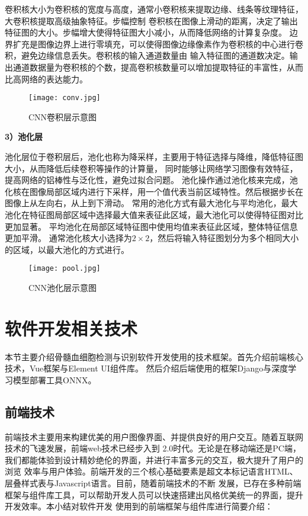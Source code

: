 卷积核大小为卷积核的宽度与高度，通常小卷积核来提取边缘、线条等纹理特征，大卷积核提取高级抽象特征。步幅控制
卷积核在图像上滑动的距离，决定了输出特征图的大小。步幅增大使得特征图大小减小，从而降低网络的计算复杂度。
边界扩充是图像边界上进行零填充，可以使得图像边缘像素作为卷积核的中心进行卷积，避免边缘信息丢失。卷积核的输入通道数量由
输入特征图的通道数决定。输出通道数据量为卷积核的个数，提高卷积核数量可以增加提取特征的丰富性，从而比高网络的表达能力。

\begin{figure}
  \centering
  \texttt{[image: conv.jpg]}
  \caption{CNN卷积层示意图}
  \label{fig:conv}
\end{figure}

\textbf{3）池化层}

池化层位于卷积层后，池化也称为降采样，主要用于特征选择与降维，降低特征图大小，从而降低后续卷积等操作的计算量，
同时能够让网络学习图像有效特征，提高网络的铝棒性与泛化性，避免过拟合问题。
池化操作通过池化核来完成，池化核在图像局部区域内进行下采样，用一个值代表当前区域特性。然后根据步长在图像上从左向右，从上到下滑动。
常用的池化方式有最大池化与平均池化，最大池化在特征图局部区域中选择最大值来表征此区域，最大池化可以使得特征图对比更加显著。
平均池化在局部区域特征图中使用均值来表征此区域，整体特征信息更加平滑。
通常池化核大小选择为$2 \times 2$，然后将输入特征图划分为多个相同大小的区域，以最大池化的方式进行。

\begin{figure}
  \centering
  \texttt{[image: pool.jpg]}
  \caption{CNN池化层示意图}
  \label{fig:pool}
\end{figure}


\section{软件开发相关技术}
本节主要介绍骨髓血细胞检测与识别软件开发使用的技术框架。首先介绍前端核心技术，Vue框架与Element UI组件库。
然后介绍后端使用的框架Django与深度学习模型部署工具ONNX。

\subsection{前端技术}

前端技术主要用来构建优美的用户图像界面、并提供良好的用户交互。随着互联网技术的飞速发展，前端web技术已经步入到
2.0时代。无论是在移动端还是PC端，我们都能体验到设计精妙绝伦的界面，并进行丰富多元的交互，极大提升了用户的浏览
效率与用户体验。前端开发的三个核心基础要素是超文本标记语言HTML、层叠样式表与Javascript语言。目前，随着前端技术的不断
发展，已存在多种前端框架与组件库工具，可以帮助开发人员可以快速搭建出风格优美统一的界面，提升开发效率。本小结对软件开发
使用到的前端框架与组件库进行简要介绍：

